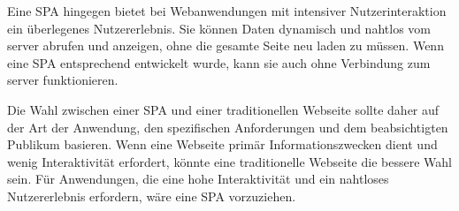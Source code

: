 Eine \ac{SPA} hingegen bietet bei Webanwendungen mit intensiver Nutzerinteraktion ein überlegenes Nutzererlebnis.
Sie können Daten dynamisch und nahtlos vom \gls{server} abrufen und anzeigen, ohne die gesamte Seite neu laden zu müssen.
Wenn eine \ac{SPA} entsprechend entwickelt wurde, kann sie auch ohne Verbindung zum \gls{server} funktionieren.

Die Wahl zwischen einer \ac{SPA} und einer traditionellen Webseite sollte daher auf der Art der Anwendung, den spezifischen Anforderungen und dem beabsichtigten Publikum basieren.
Wenn eine Webseite primär Informationszwecken dient und wenig Interaktivität erfordert, könnte eine traditionelle Webseite die bessere Wahl sein.
Für Anwendungen, die eine hohe Interaktivität und ein nahtloses Nutzererlebnis erfordern, wäre eine \ac{SPA} vorzuziehen.


